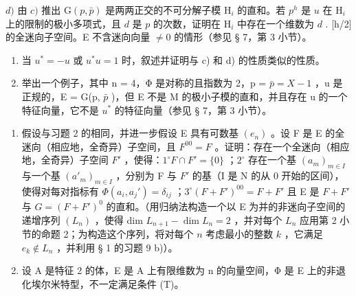 \(d)\) 由 \(c)\) 推出 \(\mathrm{G}(p,\bar{p})\) 是两两正交的不可分解子模 \(\mathrm{H}_{i}\) 的直和。若 \(p^{h}\) 是 \(u\) 在 \(\mathrm{H}_{i}\) 上的限制的极小多项式，且 \(d\) 是 \(p\) 的次数，证明在 \(\mathrm{H}_{i}\) 中存在一个维数为 \(d\) . {[}h/2{]} 的全迷向子空间。E 不含迷向向量 \(\neq 0\) 的情形（参见 § 7，第 3 小节）。

\begin{enumerate}
\def\labelenumi{\alph{enumi})}
\setcounter{enumi}{4}
\item
  当 \(u^{*} = -u\) 或 \(u^{*}u = 1\) 时，叙述并证明与 c) 和 d) 的性质类似的性质。
\item
  举出一个例子，其中 n = 4，Φ 是对称的且指数为 2，p = \(\bar{p} = X - 1\) ，u 是正规的，E = G(p, \(\bar{p}\) )，但 E 不是 M 的极小子模的直和，并且存在 u 的一个特征向量，它不是 \(u^{*}\) 的特征向量（参见 § 7，第 3 小节）。
\end{enumerate}

\begin{enumerate}
\def\labelenumi{\arabic{enumi})}
\setcounter{enumi}{12}
\item
  假设与习题 2 的相同，并进一步假设 E 具有可数基 \((e_n)\) 。设 F 是 E 的全迷向（相应地，全奇异）子空间，且 \(F^{00} = F\) 。证明：存在一个全迷向（相应地，全奇异）子空间 \(F'\) ，使得：\(1^\circ F \cap F' = \{0\}\) ；\(2^\circ\) 存在一个基 \((a_m)_{m \in I}\) 与一个基 \((a'_m)_{m \in I}\) ，分别为 F 与 \(F'\) 的基（I 是 N 的从 0 开始的区间），使得对每对指标有 \(\Phi(a_i, a_j') = \delta_{ij}\) ；\(3^\circ (F + F')^{00} = F + F'\) 且 E 是 \(F + F'\) 与 \(G = (F + F')^0\) 的直和。（用归纳法构造一个以 E 为并的非迷向子空间的递增序列 \((L_n)\) ，使得 dim \(L_{n+1} - \dim L_n = 2\) ，并对每个 \(L_n\) 应用第 2 小节的命题 2；为构造这个序列，将对每个 \(n\) 考虑最小的整数 \(k\) ，它满足 \(e_k \notin L_n\) ，并利用 § 1 的习题 9 b)）。
\item
  设 A 是特征 2 的体，E 是 A 上有限维数为 n 的向量空间，Φ 是 E 上的非退化埃尔米特型，不一定满足条件 (T)。
\end{enumerate}

